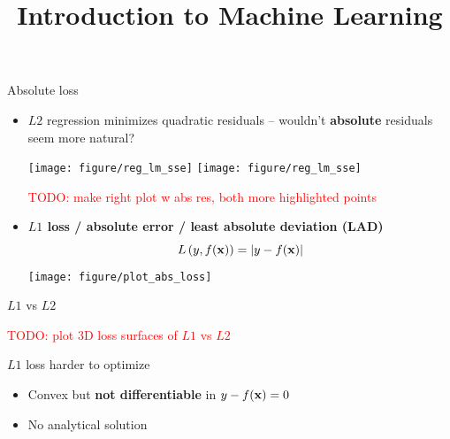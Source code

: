 \documentclass[11pt,compress,t,notes=noshow, xcolor=table]{beamer}
\title{Introduction to Machine Learning}
\institute{\href{https://compstat-lmu.github.io/lecture_i2ml/}{compstat-lmu.github.io/lecture\_i2ml}}
\date{}
\begin{document}


\begin{vbframe}{Absolute loss}

\begin{itemize}
    \item $L2$ regression minimizes quadratic residuals -- wouldn't 
    \textbf{absolute} residuals seem more natural? 
    
    \vspace{0.2cm}
    \texttt{[image: figure/reg\_lm\_sse]}
    \texttt{[image: figure/reg\_lm\_sse]}
    
    \textcolor{red}{TODO: make right plot w abs res, both more highlighted 
    points
    }
    \item \textbf{$L1$ loss / absolute error / least absolute deviation (LAD)}
    $$
    L\left(y, f(\mathbf{x})\right) = |y-f(\mathbf{x})|
    $$
    \texttt{[image: figure/plot\_abs\_loss]} 
\end{itemize}

\end{vbframe}


\begin{vbframe}{$L1$ vs $L2$}

\textcolor{red}{TODO: plot 3D loss surfaces of $L1$ vs $L2$}

\vfill

$L1$ loss harder to optimize
\begin{itemize}
    \item Convex but \textbf{not differentiable} in 
    $y - f(\mathbf{x}) = 0$
    \item No analytical solution
\end{itemize}

\end{vbframe}

\end{document}
